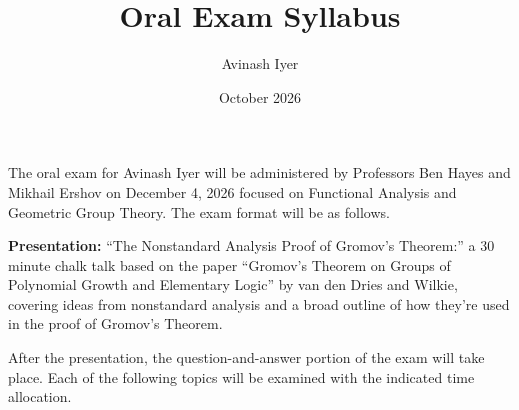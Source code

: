 \documentclass[10pt]{mypackage}
\title{Oral Exam Syllabus}
\date{October 2026}
\author{Avinash Iyer}
\begin{document}
\RaggedRight
\maketitle
The oral exam for Avinash Iyer will be administered by Professors Ben Hayes and Mikhail Ershov on December 4, 2026 focused on Functional Analysis and Geometric Group Theory. The exam format will be as follows.

\textbf{Presentation:} ``The Nonstandard Analysis Proof of Gromov's Theorem:'' a 30 minute chalk talk based on the paper ``Gromov's Theorem on Groups of Polynomial Growth and Elementary Logic'' by van den Dries and Wilkie, covering ideas from nonstandard analysis and a broad outline of how they're used in the proof of Gromov's Theorem.

After the presentation, the question-and-answer portion of the exam will take place. Each of the following topics will be examined with the indicated time allocation.
\end{document}
